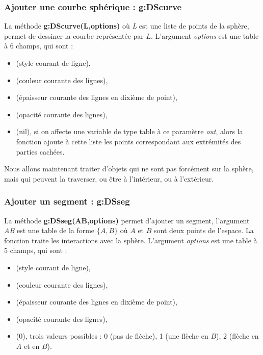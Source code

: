 \subsubsection{Ajouter une courbe sphérique : g:DScurve}

La méthode \textbf{g:DScurve(L,options)} où \emph{L} est une liste de points de la sphère, permet de dessiner la courbe représentée par $L$. L'argument \emph{options} est une table à 6 champs, qui sont :
    \begin{itemize}
        \item {} (style courant de ligne), 
        \item {} (couleur courante des lignes),
        \item {} (épaisseur courante des lignes en dixième de point),
        \item {} (opacité courante des lignes),
        \item {} (nil), si on affecte une variable de type table à ce paramètre \emph{out}, alors la fonction ajoute à cette liste les points correspondant aux extrémités des parties cachées.
    \end{itemize}
    
Nous allons maintenant traiter d'objets qui ne sont pas forcément sur la sphère, mais qui peuvent la traverser, ou être à l'intérieur, ou à l'extérieur.

\subsubsection{ Ajouter un segment : g:DSseg}

La méthode \textbf{g:DSseg(AB,options)} permet d'ajouter un segment, l'argument \emph{AB} est une table de la forme $\{A,B\}$ où $A$ et $B$ sont deux points de l'espace. La fonction traite les interactions avec la sphère. L'argument \emph{options} est une table à 5 champs, qui sont :
    \begin{itemize}
        \item {} (style courant de ligne), 
        \item {} (couleur courante des lignes),
        \item {} (épaisseur courante des lignes en dixième de point),
        \item {} (opacité courante des lignes),
        \item {} (0), trois valeurs possibles : 0 (pas de flèche), 1 (une flèche en $B$), 2 (flèche en $A$ et en $B$).
    \end{itemize}
    
